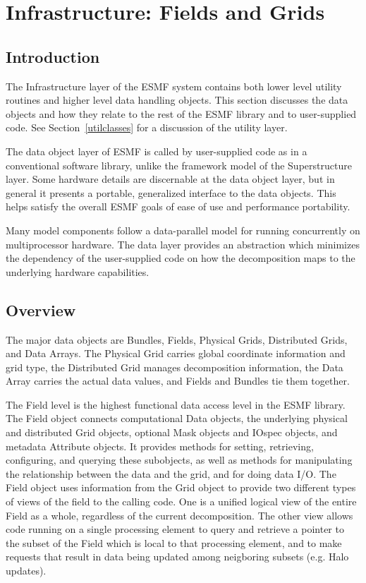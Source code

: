 \section{Infrastructure: Fields and Grids}
\label{sec:fieldclasses}

\subsection{Introduction}

The Infrastructure layer of the ESMF system contains both lower
level utility routines and higher level data handling objects.
This section discusses the data objects and how they relate to
the rest of the ESMF library and to user-supplied code.  
See Section~\ref{utilclasses} for a discussion of the utility layer.

The data object layer of ESMF is called by user-supplied code
as in a conventional software library, unlike the framework model
of the Superstructure layer.
Some hardware details are discernable at the data object layer, 
but in general it presents a portable, generalized interface to the
data objects.
This helps satisfy the overall ESMF goals of ease of use and
performance portability.

Many model components follow a data-parallel model for running
concurrently on multiprocessor hardware.
The data layer provides an abstraction which
minimizes the dependency of the user-supplied code on 
how the decomposition maps to the underlying hardware
capabilities.  


\subsection{Overview}

The major data objects are Bundles,
Fields, Physical Grids, Distributed Grids, and Data Arrays.
The Physical Grid carries global coordinate information and grid type,
the Distributed Grid manages decomposition information, 
the Data Array carries the actual
data values, and Fields and Bundles tie them together.

The Field level is the highest functional data access level in the ESMF library.
The Field object connects computational Data objects, the underlying
physical and distributed Grid objects, optional Mask objects and IOspec
objects, and metadata Attribute objects.  
It provides methods
for setting, retrieving, configuring, and querying these subobjects,
as well as methods for manipulating the relationship between the
data and the grid, and for doing data I/O. 
The Field object uses information from the Grid object to provide
two different types of views of the field to the calling code.
One is a unified logical view of the entire Field as a whole,
regardless of the current decomposition.  The other view allows code
running on a single processing element to query and retrieve a pointer 
to the subset of the Field which is local to that processing element,
and to make requests that result in data being updated among neigboring
subsets (e.g. Halo updates).

